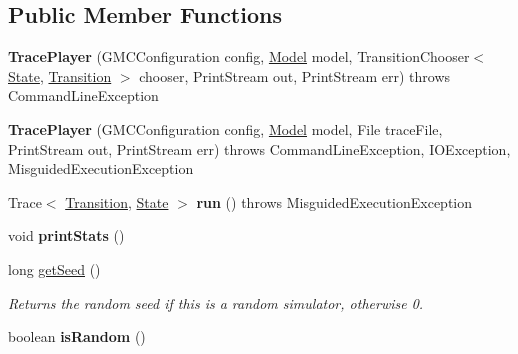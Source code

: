 \subsection*{Public Member Functions}
\begin{DoxyCompactItemize}
\item 
\hypertarget{classedu_1_1udel_1_1cis_1_1vsl_1_1civl_1_1run_1_1IF_1_1TracePlayer_a8cea1dcdcd543d61be60603c1a30b687}{}{\bfseries Trace\+Player} (G\+M\+C\+Configuration config, \hyperlink{interfaceedu_1_1udel_1_1cis_1_1vsl_1_1civl_1_1model_1_1IF_1_1Model}{Model} model, Transition\+Chooser$<$ \hyperlink{interfaceedu_1_1udel_1_1cis_1_1vsl_1_1civl_1_1state_1_1IF_1_1State}{State}, \hyperlink{interfaceedu_1_1udel_1_1cis_1_1vsl_1_1civl_1_1semantics_1_1IF_1_1Transition}{Transition} $>$ chooser, Print\+Stream out, Print\+Stream err)  throws Command\+Line\+Exception \label{classedu_1_1udel_1_1cis_1_1vsl_1_1civl_1_1run_1_1IF_1_1TracePlayer_a8cea1dcdcd543d61be60603c1a30b687}

\item 
\hypertarget{classedu_1_1udel_1_1cis_1_1vsl_1_1civl_1_1run_1_1IF_1_1TracePlayer_a8b0aab12b85842c97d1a8093b9b0f682}{}{\bfseries Trace\+Player} (G\+M\+C\+Configuration config, \hyperlink{interfaceedu_1_1udel_1_1cis_1_1vsl_1_1civl_1_1model_1_1IF_1_1Model}{Model} model, File trace\+File, Print\+Stream out, Print\+Stream err)  throws Command\+Line\+Exception, 			\+I\+O\+Exception, Misguided\+Execution\+Exception \label{classedu_1_1udel_1_1cis_1_1vsl_1_1civl_1_1run_1_1IF_1_1TracePlayer_a8b0aab12b85842c97d1a8093b9b0f682}

\item 
\hypertarget{classedu_1_1udel_1_1cis_1_1vsl_1_1civl_1_1run_1_1IF_1_1TracePlayer_a6f2fb1b834ff66954d09fcb0f2807c6a}{}Trace$<$ \hyperlink{interfaceedu_1_1udel_1_1cis_1_1vsl_1_1civl_1_1semantics_1_1IF_1_1Transition}{Transition}, \hyperlink{interfaceedu_1_1udel_1_1cis_1_1vsl_1_1civl_1_1state_1_1IF_1_1State}{State} $>$ {\bfseries run} ()  throws Misguided\+Execution\+Exception \label{classedu_1_1udel_1_1cis_1_1vsl_1_1civl_1_1run_1_1IF_1_1TracePlayer_a6f2fb1b834ff66954d09fcb0f2807c6a}

\item 
\hypertarget{classedu_1_1udel_1_1cis_1_1vsl_1_1civl_1_1run_1_1IF_1_1TracePlayer_a6be3cba38099896c492547336ab3de18}{}void {\bfseries print\+Stats} ()\label{classedu_1_1udel_1_1cis_1_1vsl_1_1civl_1_1run_1_1IF_1_1TracePlayer_a6be3cba38099896c492547336ab3de18}

\item 
long \hyperlink{classedu_1_1udel_1_1cis_1_1vsl_1_1civl_1_1run_1_1IF_1_1TracePlayer_a49c0a3ceb778204c1822fd6c93471d2f}{get\+Seed} ()
\begin{DoxyCompactList}\small\item\em Returns the random seed if this is a random simulator, otherwise 0. \end{DoxyCompactList}\item 
\hypertarget{classedu_1_1udel_1_1cis_1_1vsl_1_1civl_1_1run_1_1IF_1_1TracePlayer_aa840166f02789871a26d1dd2f124a8ab}{}boolean {\bfseries is\+Random} ()\label{classedu_1_1udel_1_1cis_1_1vsl_1_1civl_1_1run_1_1IF_1_1TracePlayer_aa840166f02789871a26d1dd2f124a8ab}

\end{DoxyCompactItemize}
